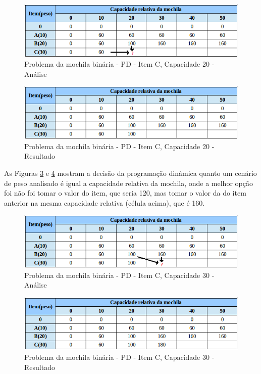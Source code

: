 \FloatBarrier
\begin{figure}[!h]
\centering
\includegraphics[keepaspectratio=true,scale=0.6]{figuras/mochila30_20.png}
\caption{Problema da mochila binária - PD - Item C, Capacidade 20 - Análise}
\label{mochila30_20}
\end{figure}

\FloatBarrier
\begin{figure}[!h]
\centering
\includegraphics[keepaspectratio=true,scale=0.6]{figuras/mochila30_20_resp.png}
\caption{Problema da mochila binária - PD - Item C, Capacidade 20 - Resultado}
\label{mochila30_20_resp}
\end{figure}

As Figuras \ref{mochila30_30} e \ref{mochila30_30_resp} mostram a decisão da programação dinâmica quanto um cenário de peso analisado é igual a capacidade relativa da mochila, onde a melhor opção foi não foi tomar o valor do item, que seria 120, mas tomar o valor da do item anterior na mesma capacidade relativa (célula acima), que é 160.
\FloatBarrier
\begin{figure}[!h]
\centering
\includegraphics[keepaspectratio=true,scale=0.6]{figuras/mochila30_30.png}
\caption{Problema da mochila binária - PD - Item C, Capacidade 30 - Análise}
\label{mochila30_30}
\end{figure}

\FloatBarrier
\begin{figure}[!h]
\centering
\includegraphics[keepaspectratio=true,scale=0.6]{figuras/mochila30_30_resp.png}
\caption{Problema da mochila binária - PD - Item C, Capacidade 30 - Resultado}
\label{mochila30_30_resp}
\end{figure}


